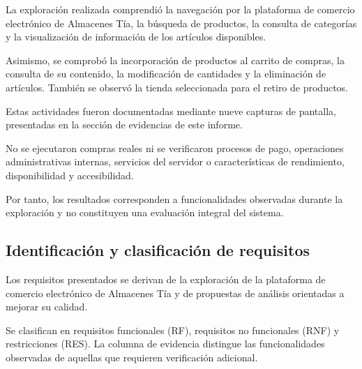 \documentclass[12pt,a4paper]{article}
\renewcommand{\arraystretch}{1.17}
\begin{document}
La exploración realizada comprendió la navegación
por la plataforma de comercio electrónico de
Almacenes Tía, la búsqueda de productos, la
consulta de categorías y la visualización de
información de los artículos disponibles.

Asimismo, se comprobó la incorporación de
productos al carrito de compras, la consulta
de su contenido, la modificación de cantidades
y la eliminación de artículos. También se
observó la tienda seleccionada para el retiro
de productos.

Estas actividades fueron documentadas mediante
nueve capturas de pantalla, presentadas en
la sección de evidencias de este informe.

No se ejecutaron compras reales ni se
verificaron procesos de pago, operaciones
administrativas internas, servicios del
servidor o características de rendimiento,
disponibilidad y accesibilidad.

Por tanto, los resultados corresponden a
funcionalidades observadas durante la
exploración y no constituyen una evaluación
integral del sistema.




\subsection{Identificación y clasificación de requisitos}

Los requisitos presentados se derivan de la
exploración de la plataforma de comercio
electrónico de Almacenes Tía y de propuestas
de análisis orientadas a mejorar su calidad.

Se clasifican en requisitos funcionales (RF),
requisitos no funcionales (RNF) y restricciones
(RES). La columna de evidencia distingue
las funcionalidades observadas de aquellas
que requieren verificación adicional.


\begingroup
\footnotesize
\setlength{\tabcolsep}{3pt}
\renewcommand{\arraystretch}{1.1}
\end{document}
